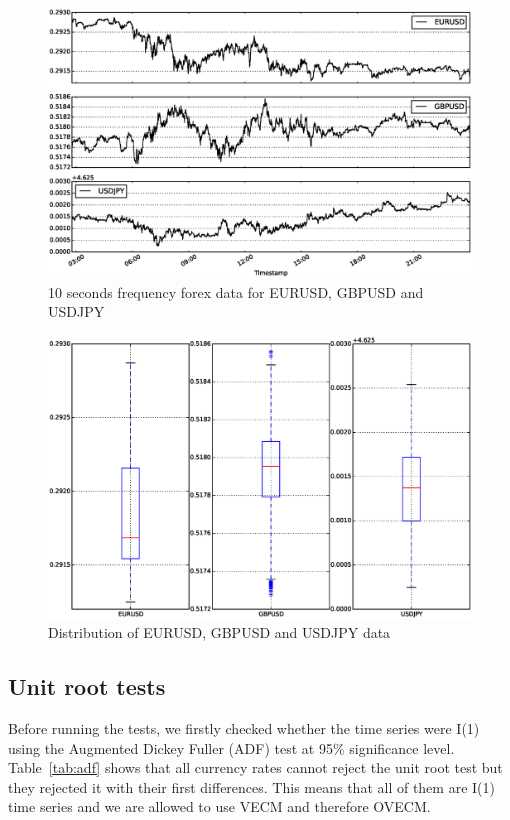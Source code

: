 \documentclass[twocolumn]{svjour3}          %
\begin{document}
\hspace*{-1.5in}
\begin{figure}[!ht]
  \vspace*{-1cm}
  \hspace*{-0.4in}
  \centering
  \includegraphics[scale=0.34]{forexdata}
  \caption{10 seconds frequency forex data for EURUSD, GBPUSD and USDJPY}
  \label{fig:forexdata}
\end{figure}

\begin{figure}[!ht]
  \vspace*{-1cm}
  \hspace*{-0.3in}
  \centering
  \includegraphics[scale=0.3]{distdata}
  \caption{Distribution of EURUSD, GBPUSD and USDJPY data}
  \label{fig:distdata}
\end{figure}

\subsection{Unit root tests} \label{sec:unitroot}
Before running the tests, we firstly checked whether the time series were
I(1) using the Augmented Dickey Fuller (ADF) \cite{dickey1979,dickey1981} test at 95\% significance level.
Table~\ref{tab:adf} shows that all currency rates cannot reject the unit root
test but they rejected it with their first differences. This means that all of
them are I(1) time series and we are allowed to use VECM and therefore OVECM.
\end{document}
